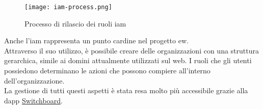 \begin{figure}[h]
    \texttt{[image: iam-process.png]}
    \centering
    \caption{Processo di rilascio dei ruoli \gls{iam} \cite{img:iam}}
    \label{lab:iam-process}
\end{figure}

Anche l'\gls{iam} rappresenta un punto cardine nel progetto \gls{ew}. \\
Attraverso il suo utilizzo, è possibile creare delle organizzazioni con una struttura gerarchica, simile ai domini attualmente utilizzati sul web.
I ruoli che gli utenti possiedono determinano le azioni che possono compiere all'interno dell'organizzazione. \\
La gestione di tutti questi aspetti è stata resa molto più accessibile grazie alla \gls{dapp} \href{https://switchboard.energyweb.org/}{Switchboard}.